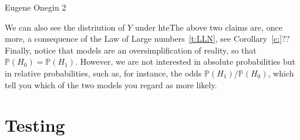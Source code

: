 \begin{example}{Eugene Onegin 2 }
\begin{knitrout}
\begin{kframe}
{\ttfamily\noindent\bfseries\color{errorcolor}{\#\# Error: oggetto 'from' non trovato}}\begin{alltt}
 \hlkwb{<-}  \hlopt{==}  \hlopt{&}  \hlopt{==} \hldef{)}
\end{alltt}


{\ttfamily\noindent\bfseries\color{errorcolor}{\#\# Error: oggetto 'from' non trovato}}\begin{alltt}
 \hlkwb{<-}  \hlopt{==}  \hlopt{&}  \hlopt{==} \hldef{)}
\end{alltt}


{\ttfamily\noindent\bfseries\color{errorcolor}{\#\# Error: oggetto 'from' non trovato}}\begin{alltt}
 \hlkwb{<-}  \hlopt{/}  \hlopt{+}   
\end{alltt}


{\ttfamily\noindent\bfseries\color{errorcolor}{\#\# Error: oggetto 'n\_01' non trovato}}\begin{alltt}
 \hlkwb{<-}  \hlopt{/}  \hlopt{+}   
\end{alltt}


{\ttfamily\noindent\bfseries\color{errorcolor}{\#\# Error: oggetto 'n\_10' non trovato}}\end{kframe}
\end{knitrout}

	We can also see the distriution of $Y$ under hteThe above two claims are, once more, a consequence of the Law of Large numbers~\ref{t:LLN}, see Corollary~\ref{c:}??
	Finally, notice that models are an oversimplification of reality, so that $\mathbb P(H_0) = \mathbb P(H_1)$. However, we are not interested in absolute probabilities but in relative probabilities, such as, for instance, the odds $\mathbb P(H_1)/\mathbb P(H_0)$, which tell you which of the two models you regard as more likely.  
	\end{example}

	

	\section{ Testing}
	
